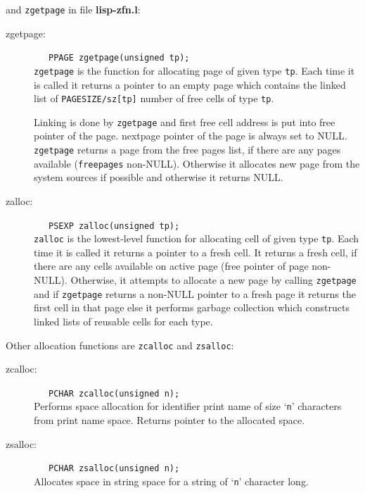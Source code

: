 and {\tt zgetpage} in file {\bf lisp-zfn.l}:
\begin{description}
  \item[zgetpage:]\ \ \ {\tt PPAGE zgetpage(unsigned tp);} \\
     {\tt zgetpage} is the
     function for allocating page of given type {\tt tp}. Each time it is
     called it returns a pointer to an empty page which contains the
     linked list of {\tt PAGESIZE/sz[tp]} number of free cells of type {\tt tp}.

     Linking is done by \mbox{\tt zgetpage}
     and first free cell address is put into free pointer of the page.
     nextpage pointer of the page is always set to NULL.
     \mbox{\tt zgetpage} returns a page from the free pages list,
     if there are any pages available ({\tt freepages} non-NULL). Otherwise
     it allocates new page from the system sources if possible and
     otherwise it returns NULL.

  \item[zalloc:]\ \ \ {\tt PSEXP zalloc(unsigned tp);} \\
     {\tt zalloc} is the lowest-level
     function for allocating cell of given type {\tt tp}. Each time it is
     called it returns a pointer to a fresh cell. It returns a fresh cell,
     if there are any cells available on active page
     (free pointer of page non-NULL). Otherwise, it attempts to allocate a
     new page by calling {\tt zgetpage} and if {\tt zgetpage} returns a
     non-NULL pointer
     to a fresh page it returns the first cell in that page else it performs
     garbage collection which constructs linked lists of reusable cells
     for each type.
\end{description}
Other allocation functions are {\tt zcalloc} and {\tt zsalloc}:
\begin{description}
  \item[zcalloc:]\ \ \ {\tt PCHAR zcalloc(unsigned n); } \\
    Performs  space allocation for identifier print name
    of size `{\tt n}' characters  from
    print name space. Returns pointer to the allocated space.
  \item[zsalloc:]\ \ \ {\tt PCHAR zsalloc(unsigned n);}  \\
    Allocates space in string space for a string of `{\tt n}' character long.
\end{description}

\setlength{\unitlength}{1ex} %
